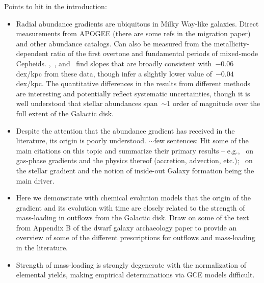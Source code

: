 Points to hit in the introduction:
\begin{itemize}

	\item Radial abundance gradients are ubiquitous in Milky Way-like galaxies.
	Direct measurements from APOGEE (there are some refs in the migration
	paper) and other abundance catalogs.
	Can also be measured from the metallicity-dependent ratio of the first
	overtone and fundamental periods of mixed-mode Cepheids.
	\citet{Luck2011a},~\citet{Luck2011b}, and~\citet{Genovali2014} find slopes
	that are broadly consistent with~$-0.06$ dex/kpc from these data, though
	\citet{Lemasle2018} infer a slightly lower value of~$-0.04$ dex/kpc.
	The quantitative differences in the results from different methods are
	interesting and potentially reflect systematic uncertainties, though it is
	well understood that stellar abundances span~$\sim$1 order of magnitude
	over the full extent of the Galactic disk.

	\item Despite the attention that the abundance gradient has received in the
	literature, its origin is poorly understood.
	{\color{red} $\sim$few sentences:} Hit some of the main citations on this
	topic and summarize their primary results -- e.g.,~\citet{Sharda2021a,
	Sharda2021b} on gas-phase gradients and the physics thereof (accretion,
	advection, etc.);~\citet{Minchev2013, Minchev2014} on the stellar gradient
	and the notion of inside-out Galaxy formation being the main driver.

	\item Here we demonstrate with chemical evolution models that the origin
	of the gradient and its evolution with time are closely related to the
	strength of mass-loading in outflows from the Galactic disk.
	Draw on some of the text from Appendix B of the dwarf galaxy archaeology
	paper to provide an overview of some of the different prescriptions for
	outflows and mass-loading in the literature.

	\item Strength of mass-loading is strongly degenerate with the
	normalization of elemental yields, making empirical determinations via
	GCE models difficult.

\end{itemize}

